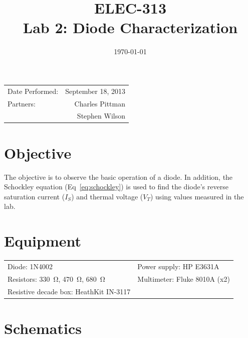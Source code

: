 \documentclass{article}
\author{}
\title{ELEC-313 \\ Lab 2: Diode Characterization \\ }
\date{\today}
\begin{document}
\maketitle

\begin{center}
  \begin{tabular}{lr}
    Date Performed: & September 18, 2013 \\
    Partners: & Charles Pittman \\
    & Stephen Wilson \\
  \end{tabular}
\end{center}

\newpage

\tableofcontents
\listoffigures
\listoftables

\newpage


\renewcommand{\labelenumi}{\alph{enumi}.}

\section{Objective}
\label{sec:objective}

The objective is to observe the basic operation of a diode.  In
addition, the Schockley equation (Eq~\ref{eq:schockley}) is used to
find the diode's reverse saturation current ($I_S$) and thermal
voltage ($V_T$) using values measured in the lab.

\section{Equipment}
\label{sec:equipment}

\begin{tabular}{ll}
  \centering
  Diode: 1N4002 & Power supply: HP E3631A \\
  Resistors: \SI{330}{\ohm}, \SI{470}{\ohm}, \SI{680}{\ohm} & Multimeter: Fluke 8010A (x2)\\
  Resistive decade box: HeathKit IN-3117 & \\
\end{tabular}

\section{Schematics}
\label{sec:schematics}
\end{document}
